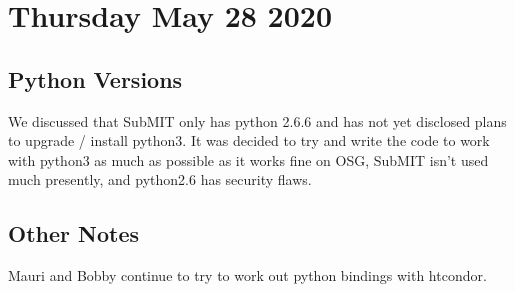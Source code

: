 \section{Thursday May 28 2020}
    \subsection*{Python Versions}
        \indent We discussed that SubMIT only has python 2.6.6 and has not yet disclosed plans to upgrade / install python3. It was decided to try and write the code to work with python3 as much as possible as it works fine on OSG, SubMIT isn't used much presently, and python2.6 has security flaws.
    \subsection*{Other Notes}
        \indent Mauri and Bobby continue to try to work out python bindings with htcondor.
    





